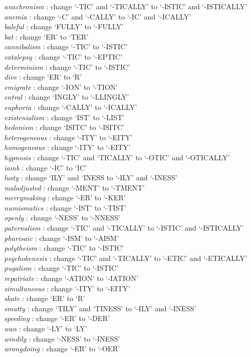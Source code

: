 \noindent
{\it anachronism} : change `-TIC' and `-TICALLY' to `-ISTIC' and `-ISTICALLY' \\
{\it anemia}      : change `-C' and `-CALLY' to `-IC' and `-ICALLY' \\
{\it baleful}     : change `FULLY' to `-FULLY' \\
{\it bat}         : change `ER' to `TER' \\
{\it cannibalism} : change `-TIC' to `-ISTIC' \\
{\it catalepsy}   : change `-TIC' to `-EPTIC' \\
{\it determinism} : change `-TIC' to `-ISTIC' \\
{\it dive}        : change `ER' to `R' \\
{\it emigrate}    : change `-ION' to `-TION' \\
{\it entral}      : change `INGLY' to `-LLINGLY' \\
{\it euphoria}    : change `-CALLY' to `-ICALLY' \\
{\it existenialism} : change  `IST' to `-LIST' \\
{\it hedonism}    : change `ISITC' to `-ISITC' \\
{\it heterogeneous} : change `-ITY' to `-EITY' \\
{\it homogeneous} : change `-ITY' to `-EITY' \\
{\it hypnosis}    : change `-TIC' and `TICALLY' to `-OTIC' and `-OTICALLY' \\
{\it iamb}        : change `-IC' to `IC' \\
{\it lusty}       : change `ILY' and `INESS to `-ILY' and `-INESS' \\
{\it maladjusted} : change `-MENT' to `-TMENT' \\
{\it merrymaking} : change `-ER' to `-KER' \\
{\it numismatics} : change `-IST' to `-TIST' \\
{\it openly}      : change `-NESS' to `-NNESS' \\
{\it paternalism} : change `-TIC' and `-TICALLY' to `-ISTIC' and `-ISTICALLY' \\
{\it pharisaic}   : change `-ISM' to `-AISM' \\
{\it polytheism}  : change `-TIC' to `-ISTIC' \\
{\it psychokenesis} : change `-TIC' and `-TICALLY' to `-ETIC' and `-ETICALLY' \\
{\it pugalism}    : change `-TIC' to `-ISTIC' \\
{\it repatriate}  : change `-ATION' to `-IATION' \\
{\it simultaneous} : change `-ITY' to `-EITY' \\
{\it skate}       : change `ER' to `R' \\
{\it smutty}      : change `TILY' and `TINESS' to `-ILY' and `-INESS' \\
{\it speeding}    : change `-ER' to `-DER' \\
{\it wan}         : change `-LY' to `LY' \\
{\it windily}     : change `-NESS' to `-INESS' \\
{\it wrongdoing}  : change `-ER' to `-OER' \\



